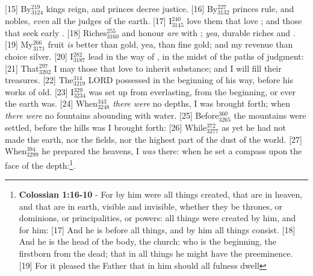 [15] \textcolor[cmyk]{0.99998,1,0,0}{By\textcolor{jungle}{$_{3124}^{219}$}  kings reign, and princes decree justice.}
[16] \textcolor[cmyk]{0.99998,1,0,0}{By\textcolor{jungle}{$_{3132}^{227}$}  princes rule, and nobles, \emph{even} all the judges of the earth.}
[17] \textcolor[cmyk]{0.99998,1,0,0}{I\textcolor{jungle}{$_{3145}^{240}$} love them that love ; and those that seek  early .}
[18] \textcolor[cmyk]{0.99998,1,0,0}{Riches\textcolor{jungle}{$_{3160}^{255}$} and honour \emph{are} with ; \emph{yea}, durable riches and .}
[19] \textcolor[cmyk]{0.99998,1,0,0}{My\textcolor{jungle}{$_{3171}^{266}$} fruit \emph{is} better than gold, yea, than fine gold; and my revenue than choice silver.}
[20] \textcolor[cmyk]{0.99998,1,0,0}{I\textcolor{jungle}{$_{3187}^{282}$} lead in the way of , in the midst of the paths of judgment:}
[21] \textcolor[cmyk]{0.99998,1,0,0}{That\textcolor{jungle}{$_{3202}^{297}$} I may  those that love  to inherit substance; and I will fill their treasures.}
[22] \textcolor[cmyk]{0.99998,1,0,0}{The\textcolor{jungle}{$_{3219}^{314}$} LORD possessed  in the beginning of his way, before his works of old.}
[23] \textcolor[cmyk]{0.99998,1,0,0}{I\textcolor{jungle}{$_{3234}^{329}$} was set up from everlasting, from the beginning, or ever the earth was.}
[24] \textcolor[cmyk]{0.99998,1,0,0}{When\textcolor{jungle}{$_{3248}^{343}$} \emph{there} \emph{were} no depths, I was brought forth; when \emph{there} \emph{were} no fountains abounding with water.}
[25] \textcolor[cmyk]{0.99998,1,0,0}{Before\textcolor{jungle}{$_{3265}^{360}$} the mountains were settled, before the hills was I brought forth:}
[26] \textcolor[cmyk]{0.99998,1,0,0}{While\textcolor{jungle}{$_{3277}^{372}$} as yet he had not made the earth, nor the fields, nor the highest part of the dust of the world.}
[27] \textcolor[cmyk]{0.99998,1,0,0}{When\textcolor{jungle}{$_{3299}^{394}$} he prepared the heavens, I \emph{was} there: when he set a compass upon the face of the depth:}\footnote{\textbf{Colossian 1:16-10} - For by him were all things created, that are in heaven, and that are in earth, visible and invisible, whether they be thrones, or dominions, or principalities, or powers: all things were created by him, and for him: [17] And he is before all things, and by him all things consist. [18] And he is the head of the body, the church: who is the beginning, the firstborn from the dead; that in all things he might have the preeminence. [19] For it pleased the Father that in him should all fulness dwell}.
